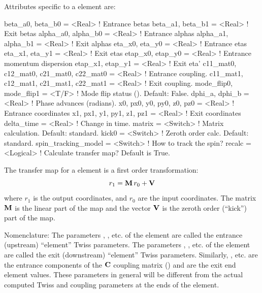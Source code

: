 {Attributes specific to a  element are:
\begin{example}
  beta_a0, beta_b0   = <Real>            ! Entrance betas
  beta_a1, beta_b1   = <Real>            ! Exit betas
  alpha_a0, alpha_b0 = <Real>            ! Entrance alphas
  alpha_a1, alpha_b1 = <Real>            ! Exit alphas
  eta_x0, eta_y0     = <Real>            ! Entrance etas 
  eta_x1, eta_y1     = <Real>            ! Exit etas 
  etap_x0, etap_y0   = <Real>            ! Entrance momentum dispersion
  etap_x1, etap_y1   = <Real>            ! Exit eta'
  c11_mat0, c12_mat0, c21_mat0, c22_mat0 = <Real>  ! Entrance coupling.
  c11_mat1, c12_mat1, c21_mat1, c22_mat1 = <Real>  ! Exit coupling.
  mode_flip0, mode_flip1 = <T/F>         ! Mode flip status (). Default: False.
  dphi_a, dphi_b            = <Real>     ! Phase advances (radians).
  x0, px0, y0, py0, z0, pz0 = <Real>     ! Entrance coordinates
  x1, px1, y1, py1, z1, pz1 = <Real>     ! Exit coordinates
  delta_time                = <Real>     ! Change in time.
  matrix                    = <Switch>   ! Matrix calculation. Default: standard.
  kick0                     = <Switch>   ! Zeroth order calc. Default: standard.
  spin_tracking_model       = <Switch>   ! How to track the spin?
  recalc                    = <Logical>  ! Calculate transfer map? Default is True.
\end{example}

The transfer map for a  element is a first order transformation:
\begin{equation}
  r_1 = {\bf M} \, r_0 + {\bf V} 
\end{equation}
where $r_1$ is the output coordinates, and $r_0$ are the input coordinates. The matrix ${\bf M}$ is
the linear part of the map and the vector ${\bf V}$ is the zeroth order (``kick'') part of the map.

Nomenclature: The parameters , , etc. of the  element are called
the entrance (upstream) ``element'' Twiss parameters. The parameters , ,
etc. of the  element are called the exit (downstream) ``element'' Twiss
parameters. Similarly, , etc. are the entrance components of the ${\bf C}$ coupling
matrix () and  are the exit end element values. These parameters in
general will be different from the actual computed Twiss and coupling parameters at the ends of the
 element.

}

